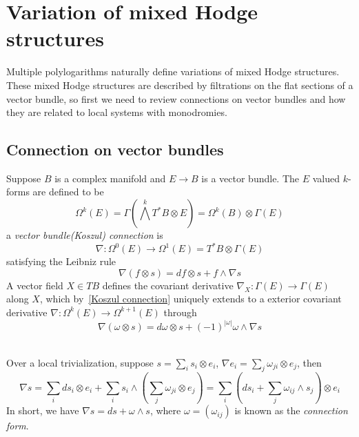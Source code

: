 \section{Variation of mixed Hodge structures}

Multiple polylogarithms naturally define variations of mixed Hodge structures. These mixed Hodge structures are described by filtrations on the flat sections of a vector bundle, so first we need to review connections on vector bundles and how they are related to local systems with monodromies.

\subsection{Connection on vector bundles}

\begin{definition}
Suppose $B$ is a complex manifold and $E\to B$ is a vector bundle. The $E$ valued $k$-forms are defined to be
\[\Omega^k(E)=\Gamma\left(\textstyle\bigwedge^kT^*B\otimes E\right)=\Omega^k(B)\otimes\Gamma(E)\]
a \textit{vector bundle(Koszul) connection} is
\[\nabla:\Omega^0(E)\to\Omega^1(E)=T^*B\otimes\Gamma(E)\]
satisfying the Leibniz rule
\begin{equation}\label{Koszul connection}
\nabla (f\otimes s)=df\otimes s+f\wedge\nabla s
\end{equation}
A vector field $X\in TB$ defines the covariant derivative $\nabla_X:\Gamma(E)\to\Gamma(E)$ along $X$, which by~\eqref{Koszul connection} uniquely extends to a exterior covariant derivative $\nabla:\Omega^k(E)\to\Omega^{k+1}(E)$ through
\[
\nabla (\omega\otimes s)=d\omega\otimes s+(-1)^{|\omega|}\omega\wedge\nabla s
\]
\end{definition}

\begin{definition} \hfill\\
Over a local trivialization, suppose $s=\sum_i s_i\otimes e_i$, $\nabla e_i=\sum_j\omega_{ji}\otimes e_j$, then
\[
\nabla s=\sum_ids_i\otimes e_i+\sum_is_i\wedge\left(\sum_j\omega_{ji}\otimes e_j\right)=\sum_i\left(ds_i+\sum_j\omega_{ij}\wedge s_j\right)\otimes e_i
\]
In short, we have $\nabla s=ds+\omega\wedge s$, where $\omega=(\omega_{ij})$ is known as the \textit{connection form}.
\end{definition}

